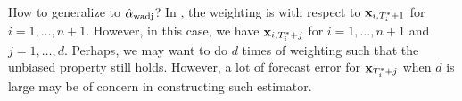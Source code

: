\documentclass[12pt]{article}
\begin{document}
\begin{challenges}
  How to generalize to $\hat{\alpha}_{\rm wadj}$? In \citep{lin2020minimizing}, the weighting is with respect to  $\mathbf{x}_{i, T_i^*+1}$ for $i = 1, \ldots, n+1$. However, in this case, we have $\mathbf{x}_{i, T_i^*+j}$ for $i = 1, \ldots, n+1$ and $j = 1, \ldots, d$. Perhaps, we may want to do $d$ times of weighting such that the unbiased  property still holds. However, a lot of forecast error for $\mathbf{x}_{T_i^*+j}$ when $d$ is large may be of concern in constructing such estimator.
\end{challenges}




\end{document}
